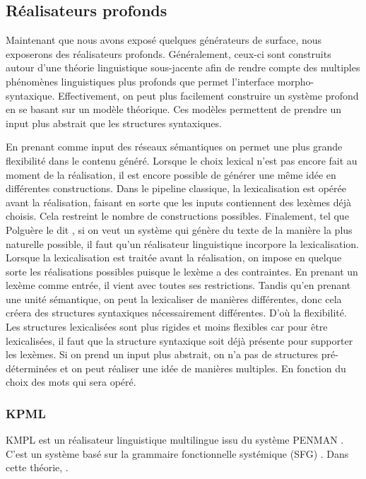 \subsection{Réalisateurs profonds}

Maintenant que nous avons exposé quelques générateurs de surface, nous exposerons des réalisateurs profonds. Généralement, ceux-ci sont construits autour d'une théorie linguistique sous-jacente afin de rendre compte des multiples phénomènes linguistiques plus profonds que permet l'interface morpho-syntaxique. Effectivement, on peut plus facilement construire un système profond en se basant sur un modèle théorique. Ces modèles permettent de prendre un input plus abstrait que les structures syntaxiques.

En prenant comme input des réseaux sémantiques on permet une plus grande flexibilité dans le contenu généré. Lorsque le choix lexical n'est pas encore fait au moment de la réalisation, il est encore possible de générer une même idée en différentes constructions. Dans le pipeline classique, la lexicalisation est opérée avant la réalisation, faisant en sorte que les inputs contiennent des lexèmes déjà choisis. Cela restreint le nombre de constructions possibles. Finalement, tel que Polguère le dit \cite{PolguerePourmodelestratifie}, si on veut un système qui génère du texte de la manière la plus naturelle possible, il faut qu'un réalisateur linguistique incorpore la lexicalisation. Lorsque la lexicalisation est traitée avant la réalisation, on impose en quelque sorte les réalisations possibles puisque le lexème a des contraintes. En prenant un lexème comme entrée, il vient avec toutes ses restrictions. Tandis qu'en prenant une unité sémantique, on peut la lexicaliser de manières différentes, donc cela créera des structures syntaxiques nécessairement différentes. D'où la flexibilité.  Les structures lexicalisées sont plus rigides et moins flexibles car pour être lexicalisées, il faut que la structure syntaxique soit déjà présente pour supporter les lexèmes. Si on prend un input plus abstrait, on n'a pas de structures pré-déterminées et on peut réaliser une idée de manières multiples. En fonction du choix des mots qui sera opéré.

\subsubsection{KPML}
KMPL\citep{BatemanEnablingTechnologyMultilingual1997} est un réalisateur linguistique multilingue issu du système PENMAN \citep{PenmanOverview}. C'est un système basé sur la grammaire fonctionnelle systémique (SFG) \citep{MatthiessenSystemicfunctionalgrammar1997}. Dans cette théorie, .

